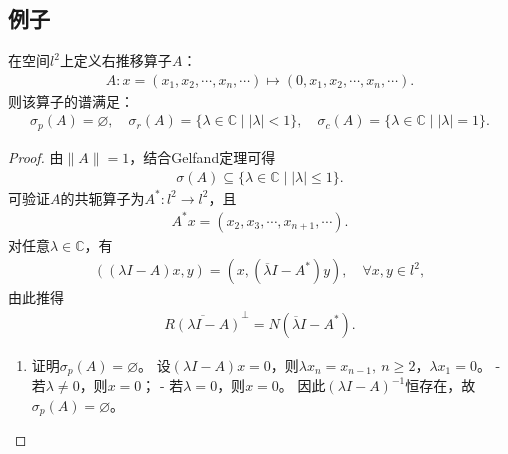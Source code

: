 \documentclass[../../main.tex]{subfiles}%
\begin{document}
\subsection{例子}

\begin{example}
在空间$l^2$上定义右推移算子$A$：
\begin{align*}
A:x=(x_1,x_2,\cdots,x_n,\cdots)\mapsto(0,x_1,x_2,\cdots,x_n,\cdots).
\end{align*}
则该算子的谱满足：
\begin{align*}
\sigma_p(A)=\varnothing ,\quad \sigma_r(A)=\{\lambda\in\mathbb{C}\mid|\lambda|<1\},\quad \sigma_c(A)=\{\lambda\in\mathbb{C}\mid|\lambda|=1\}.
\end{align*}
\end{example}
\begin{proof}
由$\|A\|=1$，结合Gelfand定理可得
\begin{align*}
\sigma(A)\subseteq\{\lambda\in\mathbb{C}\mid|\lambda|\leqslant1\}.
\end{align*}
可验证$A$的共轭算子为$A^*:l^2\to l^2$，且
\begin{align*}
A^*x=(x_2,x_3,\cdots,x_{n+1},\cdots).
\end{align*}
对任意$\lambda\in\mathbb{C}$，有
\begin{align*}
((\lambda I-A)x,y)=(x,(\overline{\lambda}I-A^*)y),\quad \forall x,y\in l^2,
\end{align*}
由此推得
\begin{align*}
\overline{R(\lambda I-A)}^{\perp}=N(\overline{\lambda}I-A^*).
\end{align*}
\begin{enumerate}[(1)]
\item 证明$\sigma_p(A)=\varnothing $。
设$(\lambda I-A)x=0$，则$\lambda x_n=x_{n-1},\ n\geqslant2$，$\lambda x_1=0$。
- 若$\lambda\neq0$，则$x=0$；
- 若$\lambda=0$，则$x=0$。
因此$(\lambda I-A)^{-1}$恒存在，故$\sigma_p(A)=\varnothing $。


\end{enumerate}
\end{proof}
\end{document}
